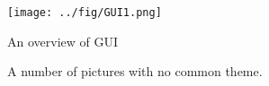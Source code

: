\documentclass[
10pt, %
a4paper, %
oneside, %
headinclude,footinclude, %
BCOR5mm, %
]{scrartcl}
\begin{document}
\begin{figure}[tb]
\centering
\texttt{[image: ../fig/GUI1.png]}
\caption[An overview of GUI]{An overview of GUI}
\label{fig:GUI1}
\end{figure}

\begin{figure}[tb]
\centering
{} \quad
{}
\caption[A number of pictures.]{A number of pictures with no common theme.}
\end{figure}
\end{document}
